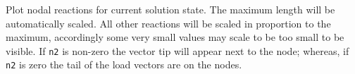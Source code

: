 \headb

Plot nodal reactions for current solution state.  The
maximum length will be automatically scaled.  All other
reactions will be scaled in proportion to the maximum, accordingly
some very small values may scale to be too small to be
visible.  If {\tt n2} is non-zero the vector tip will appear next
to the node; whereas, if {\tt n2} is zero the tail of the load
vectors are on the nodes.
\vfill
\eject
